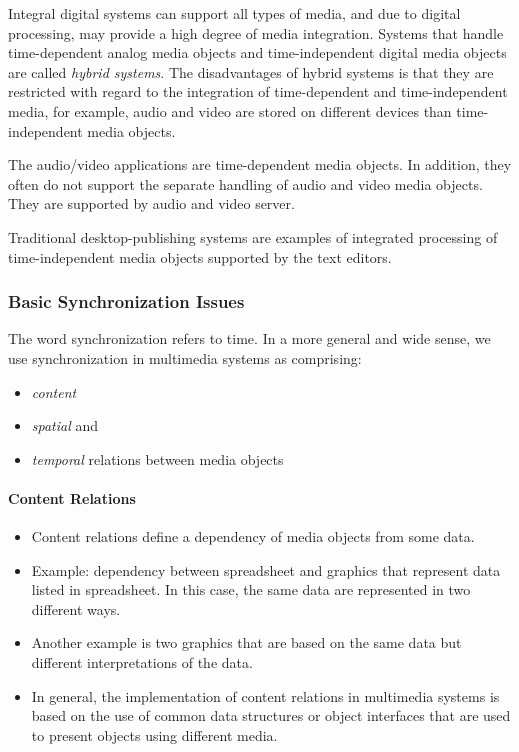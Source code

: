 Integral digital systems can support all types of media, and due to digital processing, may provide a high degree of media integration. Systems that handle time-dependent analog media objects and time-independent digital media objects are called \textit{hybrid systems}. The disadvantages of hybrid systems is that they are restricted with regard to the integration of time-dependent and time-independent media, for example, audio and video are stored on different devices than time-independent media objects.

The audio/video applications are time-dependent media objects. In addition, they often do not support the separate handling of audio and video media objects. They are supported by audio and video server.

Traditional desktop-publishing systems are examples of integrated processing of time-independent media objects supported by the text editors.

\subsubsection*{Basic Synchronization Issues}
The word synchronization refers to time. In a more general and wide sense, we use synchronization in multimedia systems as comprising:
\begin{itemize}
	\item \textit{content}
	\item \textit{spatial} and 
	\item \textit{temporal} relations between media objects
\end{itemize}


\paragraph*{Content Relations}
\begin{itemize}
	\item Content relations define a dependency of media objects from some data.
	\item Example: dependency between spreadsheet and graphics that represent data listed in spreadsheet. In this case, the same data are represented in two different ways.
	\item Another example is two graphics that are based on the same data but different interpretations of the data.
	\item In general, the implementation of content relations in multimedia systems is based on the use of common data structures or object interfaces that are used to present objects using different media.
\end{itemize}

